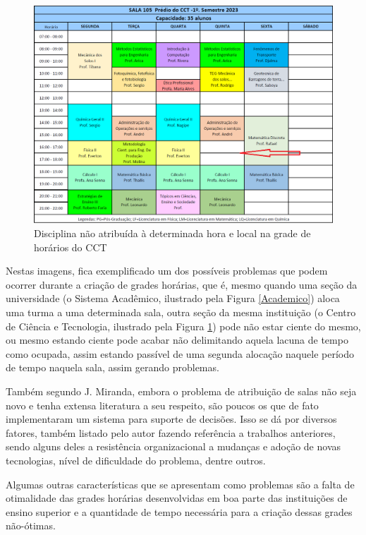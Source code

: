     \begin{figure}[htbp]\centering
        \caption{\label{CCT}Disciplina não atribuída à determinada hora e local na grade de horários do CCT}
        \includegraphics[angle=0,scale=0.5]{files/img/Falha_de_alocacao/Aulas-CCT-105-2023_1.png}
    \end{figure}    %

    Nestas imagens, fica exemplificado um dos possíveis problemas que podem ocorrer durante a criação de grades horárias, que é, mesmo quando uma seção da universidade (o Sistema Acadêmico, ilustrado pela Figura \ref{Academico}) aloca uma turma a uma determinada sala, outra seção da mesma instituição (o Centro de Ciência e Tecnologia, ilustrado pela Figura \ref{CCT}) pode não estar ciente do mesmo, ou mesmo estando ciente pode acabar não delimitando aquela lacuna de tempo como ocupada, assim estando passível de uma segunda alocação naquele período de tempo naquela sala, assim gerando problemas.

    Também segundo J. Miranda, embora o problema de atribuição de salas não seja novo e tenha extensa literatura a seu respeito, são poucos os que de fato implementaram um sistema para suporte de decisões. Isso se dá por diversos fatores, também listado pelo autor fazendo referência a trabalhos anteriores, sendo alguns deles a resistência organizacional a mudanças e adoção de novas tecnologias, nível de dificuldade do problema, dentre outros.


    Algumas outras características que se apresentam como problemas são a falta de otimalidade das grades horárias desenvolvidas em boa parte das instituições de ensino superior e a quantidade de tempo necessária para a criação dessas grades não-ótimas.

